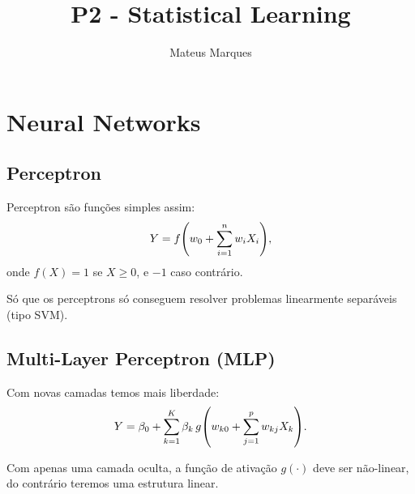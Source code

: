 \documentclass[a4paper,fleqn,12pt]{article}
\title{\Huge{\textbf{P2 - Statistical Learning}}}
\author{Mateus Marques}
\begin{document}
\maketitle

\section{Neural Networks}

\subsection{Perceptron}

Perceptron são funções simples assim:
$$
Y = f\qty(w_0 + \sum_{i=1}^{n} w_i X_i),
$$
onde $f(X) = 1$ se $X \geq 0$, e $-1$ caso contrário.

Só que os perceptrons só conseguem resolver problemas linearmente separáveis (tipo SVM).

\subsection{Multi-Layer Perceptron (MLP)}

Com novas camadas temos mais liberdade:
$$
Y =  \beta_0 + \sum_{k=1}^{K} \beta_k \, g\qty(w_{k0} + \sum_{j=1}^{p} w_{kj} X_k).
$$

Com apenas uma camada oculta, a função de ativação $g(\cdot)$ deve ser não-linear, do contrário teremos uma estrutura linear.
\end{document}
